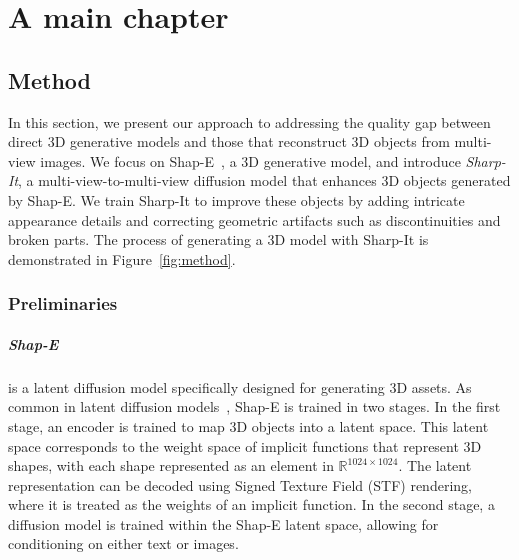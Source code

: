 \chapter{A main chapter}
\label{chap:firstchap}


\section{Method}


In this section, we present our approach to addressing the quality gap between direct 3D generative models and those that reconstruct 3D objects from multi-view images.
We focus on Shap-E~\cite{jun2023shape}, a 3D generative model, and introduce \emph{Sharp-It}, a multi-view-to-multi-view diffusion model that enhances 3D objects generated by Shap-E. We train Sharp-It to improve these objects by adding intricate appearance details and correcting geometric artifacts such as discontinuities and broken parts.
The process of generating a 3D model with Sharp-It is demonstrated in Figure~\ref{fig:method}.

\subsection{Preliminaries}%
\paragraph{Shap-E} is a latent diffusion model specifically designed for generating 3D assets. As common in latent diffusion models~\cite{rombach2022highresolutionimagesynthesislatent}, Shap-E is trained in two stages. In the first stage, an encoder is trained to map 3D objects into a latent space. This latent space corresponds to the weight space of implicit functions that represent 3D shapes, with each shape represented as an element in $\mathbb{R}^{1024\times1024}$. The latent representation can be decoded using Signed Texture Field (STF) rendering, where it is treated as the weights of an implicit function.
In the second stage, a diffusion model is trained within the Shap-E latent space, allowing for conditioning on either text or images.

